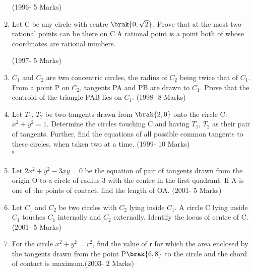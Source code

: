 \documentclass[journal,12pt,twocolumn]{IEEEtran}
\theoremstyle{remark}
\begin{document}
\begin{enumerate}
\hfill(1996- 5 Marks)\\





\item Let C be any circle with centre $\brak{0,\sqrt{2}}$. Prove that at the most two rational points can be there on C.A rational point is a point both of whose coordinates are rational numbers.
	           
\hfill(1997- 5 Marks)\\




\item $C_{1}$ and $C_{2}$ are two concentric circles, the radius of $C_{2}$ being twice that of $C_{1}$. From a point P on $C_{2}$, tangents PA and PB are drawn to $C_{1}$. Prove that the centroid of the triangle PAB lies on $C_{1}$.
	           \hfill(1998- 8 Marks)\\




\item Let $T_{1}$, $T_{2}$ be two tangents drawn from $\brak{2,0}$ onto the circle C:$x^2+y^2=1$. Determine the circles touching C and having $T_{1}$, $T_{2}$ as their pair of tangents. Further, find the equations of all possible common tangents to these circles, when taken two at a time.
                  \hfill(1999- 10 Marks)\\
⁹



\item Let $2x^2+y^2-3xy=0$ be the equation of pair of tangents drawn from the origin O to a circle of radius 3 with the centre in the first quadrant. If A is one of the points of contact, find the length of OA.                   \hfill(2001- 5 Marks)\\




\item Let $C_{1}$ and $C_{2}$ be two circles with $C_{2}$ lying inside $C_{1}$. A circle C lying inside $C_{1}$ touches $C_{1}$ internally and $C_{2}$ externally. Identify the locus of centre of C.                                \hfill(2001- 5 Marks)\\



\item For the circle $x^2+y^2=r^2$, find the value of r for which the area enclosed by the tangents drawn from the point P$\brak{6,8}$ to the circle and the chord of contact is maximum.\hfill(2003- 2 Marks)\\ 






\end{enumerate}
\end{document}

